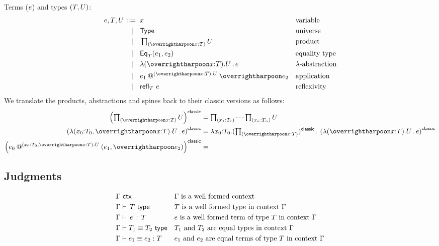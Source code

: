 Terms ($e$) and types $(T, U)$:
%
\begin{equation*}
  \e, \T, \U
  \begin{aligned}[t]
    \bnf   {}& \x   &&\text{variable} \\
    \bnfor {}& \Type & & \text{universe}\\
    \bnfor {}& \sProd{\x}{\T} \U & & \text{product}\\
    \bnfor {}& \Equal{\T}{\e_1}{\e_2} & & \text{equality type} \\
    \bnfor {}& \slam{\x}{\T}{\U} \e  &&\text{$\lambda$-abstraction} \\
    \bnfor {}& \sapp{\e_1}{\x}{\T}{\U}{\e_2}  &&\text{application} \\
    \bnfor {}& \refl{\T} \e  &&\text{reflexivity} \\
  \end{aligned}
\end{equation*}
%
We translate the products, abstractions and spines back to their classic versions as
follows:
%
\begin{align*}
  \left(\sProd{\x}{\T} \U \right)^{\mathsf{classic}} &=
  \cProd{\x_1}{\T_1} \cdots \cProd{\x_n}{\T_n} \U
  \\
  \left(
    \xlam{(\x_0{:}\T_0, \many{\x{:}\T})}{\U} \e
  \right)^{\mathsf{classic}} &=
  \clam{\x_0}{\T_0}{(\sProd{\x}{\T})^{\mathsf{classic}}}
  \left(\slam{\x}{\T}{\U} \e\right)^{\mathsf{classic}}
  \\
  \left(
    \xapp{\e_0}{(\x_0{:}\T_0, \many{\x{:}\T}).\U}{(\e_1, \many{e_2})}
  \right)^{\mathsf{classic}} &=
\end{align*}


\subsection{Judgments}
\label{sec:judgments}

\begin{align*}
& \Gamma\ \mathsf{ctx} & & \text{$\Gamma$ is a well formed context} \\
& \Gamma \vdash\, T \ \mathsf{type} & & \text{$T$ is a well formed type in context $\Gamma$} \\
& \Gamma \vdash\,e\,:\,T & & \text{$e$ is a well formed term of type $T$ in context $\Gamma$} \\
& \Gamma \vdash T_1 \equiv T_2 \ \mathsf{type} & & \text{$T_1$ and $T_2$ are equal types in context $\Gamma$} \\
& \Gamma \vdash e_1 \equiv e_2 : T & & \text{$e_1$ and $e_2$ are equal terms of type $T$ in context $\Gamma$}
\end{align*}

